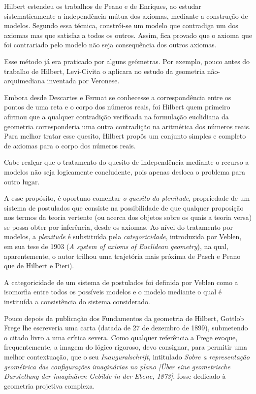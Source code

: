 \documentclass{hipatia}
\begin{document}
Hilbert estendeu os trabalhos de Peano e de Enriques, ao estudar sistematicamente a independência mútua dos axiomas, mediante a construção de modelos. Segundo essa técnica, constrói-se um modelo que contradiga um dos axiomas mas que satisfaz a todos os outros. Assim, fica provado que o axioma que foi contrariado pelo modelo não seja consequência dos outros axiomas.

Esse método já era praticado por alguns geômetras. Por exemplo, pouco antes do trabalho de Hilbert, Levi-Civita o aplicara no estudo da geometria não-arquimediana inventada por Veronese. 

Embora desde Descartes e Fermat se conhecesse a correspondência entre os pontos de uma reta e o corpo dos números reais, foi Hilbert quem primeiro afirmou que a qualquer contradição verificada na formulação euclidiana da geometria corresponderia uma outra contradição na aritmética dos números reais. Para melhor tratar esse quesito, Hilbert propôs um conjunto simples e completo de axiomas para o corpo dos números reais.

Cabe realçar que o tratamento do quesito de independência mediante o recurso a modelos não seja logicamente concludente, pois apenas desloca o problema para outro lugar. 

A esse propósito, é oportuno comentar \emph{o quesito da plenitude}, propriedade de um sistema de postulados que consiste na possibilidade de que qualquer proposição nos termos da teoria vertente (ou acerca dos objetos sobre os quais a teoria versa) se possa obter por inferência, desde os axiomas. Ao nível do tratamento por modelos, a \emph{plenitude} é substituída pela \emph{categoricidade},  introduzida por Veblen, em sua tese de 1903  (\emph{A system of axioms of Euclidean geometry}), na qual, aparentemente, o autor trilhou uma trajetória mais próxima de Pasch e Peano que de Hilbert e Pieri). 

A categoricidade de um sistema de postulados foi definida por Veblen como a isomorfia entre todos os possíveis modelos e o modelo mediante o qual é instituída a consistência do sistema considerado. \cite[p. 638]{weyl1944}

Pouco depois da publicação dos Fundamentos da geometria de Hilbert, Gottlob Frege lhe escreveria uma carta (datada de 27 de dezembro de 1899), submetendo o citado livro a uma crítica severa. Como qualquer referência a Frege evoque, frequentemente, a imagem do lógico rigoroso, devo consignar, para permitir uma melhor contextuação, que o seu \emph{Inauguralschrift}, intitulado \emph{Sobre a representação geométrica das configurações imaginárias no plano  [Über eine geometrische Darstellung der imaginären Gebilde in der Ebene, 1873]}, fosse dedicado à geometria projetiva complexa. \cite[p. 383]{belna2002}
\end{document}
